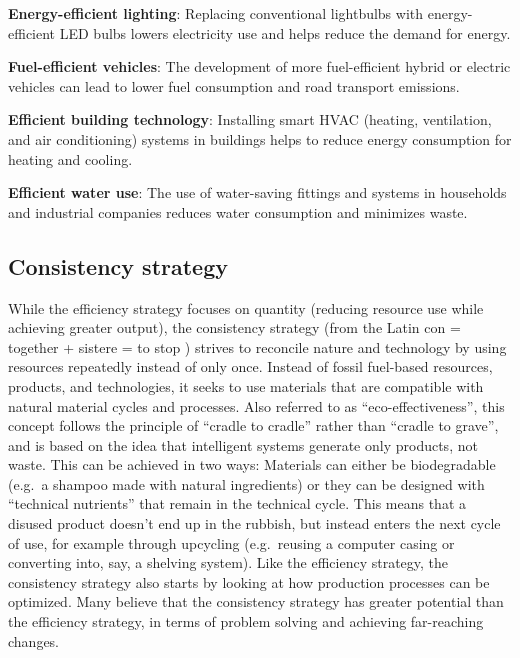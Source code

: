 \documentclass[
  a4paper,
  openany]{book}
\begin{document}
\begin{tcolorbox}[enhanced jigsaw, coltitle=black, bottomtitle=1mm, opacitybacktitle=0.6, titlerule=0mm, opacityback=0, leftrule=.75mm, colbacktitle=quarto-callout-tip-color!10!white, bottomrule=.15mm, toptitle=1mm, breakable, title={Putting Efficiency Strategies into Action: Examples}, arc=.35mm, rightrule=.15mm, toprule=.15mm, left=2mm, colback=white, colframe=quarto-callout-tip-color-frame]

\textbf{Energy-efficient lighting}: Replacing conventional lightbulbs
with energy-efficient LED bulbs lowers electricity use and helps reduce
the demand for energy.

\textbf{Fuel-efficient vehicles}: The development of more fuel-efficient
hybrid or electric vehicles can lead to lower fuel consumption and road
transport emissions.

\textbf{Efficient building technology}: Installing smart HVAC (heating,
ventilation, and air conditioning) systems in buildings helps to reduce
energy consumption for heating and cooling.

\textbf{Efficient water use}: The use of water-saving fittings and
systems in households and industrial companies reduces water consumption
and minimizes waste.

\end{tcolorbox}

\subsection{Consistency strategy}\label{consistency-strategy}

While the efficiency strategy focuses on quantity (reducing resource use
while achieving greater output), the consistency strategy (from the
Latin con = together + sistere = to stop ) strives to reconcile nature
and technology by using resources repeatedly instead of only once.
Instead of fossil fuel-based resources, products, and technologies, it
seeks to use materials that are compatible with natural material cycles
and processes. Also referred to as ``eco-effectiveness'', this concept
follows the principle of ``cradle to cradle'' rather than ``cradle to
grave'', and is based on the idea that intelligent systems generate only
products, not waste. This can be achieved in two ways: Materials can
either be biodegradable (e.g.~a shampoo made with natural ingredients)
or they can be designed with ``technical nutrients'' that remain in the
technical cycle. This means that a disused product doesn't end up in the
rubbish, but instead enters the next cycle of use, for example through
upcycling (e.g.~reusing a computer casing or converting into, say, a
shelving system). Like the efficiency strategy, the consistency strategy
also starts by looking at how production processes can be optimized.
Many believe that the consistency strategy has greater potential than
the efficiency strategy, in terms of problem solving and achieving
far-reaching changes.
\end{document}
